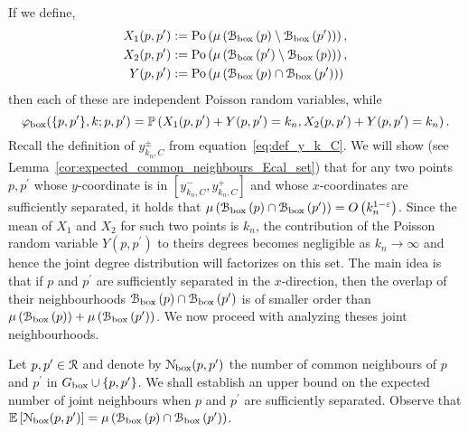 If we define,
\begin{align*}
	X_1(p,p^\prime) &:= {\mathrm{Po}}\left(\mu\left({\mathcal B}_{\text{box}}\left(p\right)\setminus {\mathcal B}_{\text{box}}\left(p^\prime\right)\right)\right),\\
	X_2(p,p^\prime) &:= {\mathrm{Po}}\left(\mu\left({\mathcal B}_{\text{box}}\left(p^\prime\right)\setminus {\mathcal B}_{\text{box}}\left(p\right)\right)\right),\\
	Y(p,p^\prime) &:= {\mathrm{Po}}\left(\mu\left({\mathcal B}_{\text{box}}\left(p\right) \cap {\mathcal B}_{\text{box}}\left(p^\prime\right)\right)\right)
\end{align*}
then each of these are independent Poisson random variables, while
\[
	\varphi_{\mathrm{box}}(\{p,p^\prime\}, k ;p,p^\prime) 
	= \mathbb{P}\left(X_1(p,p^\prime) + Y(p,p^\prime) = k_n, X_2(p,p^\prime) + Y(p,p^\prime) = k_n\right).
\]
Recall the definition of $y_{k_n,C}^\pm$ from equation~\eqref{eq:def_y_k_C}. We will show (see Lemma~\ref{cor:expected_common_neighbours_Ecal_set}) that for any two points $p, p^\prime$ whose $y$-coordinate is in $[y_{k_n, C}^-, y_{k_n,C}^+]$ and whose $x$-coordinates are sufficiently separated, it holds that $\mu\left({\mathcal B}_{\text{box}}\left(p\right) \cap {\mathcal B}_{\text{box}}\left(p^\prime\right)\right) = O\left(k_n^{1-\varepsilon}\right)$. Since the mean of $X_1$ and $X_2$ for such two points is $k_n$, the contribution of the Poisson random variable $Y(p,p^\prime)$ to theirs degrees becomes negligible as $k_n \to \infty$ and hence the joint degree distribution will factorizes on this set. The main idea is that if $p$ and $p^\prime$ are sufficiently separated in the $x$-direction, then the overlap of their neighbourhoods ${\mathcal B}_{\text{box}}\left(p\right) \cap {\mathcal B}_{\text{box}}\left(p^\prime\right)$ is of smaller order than $\mu\left({\mathcal B}_{\text{box}}\left(p\right)\right) + \mu\left({\mathcal B}_{\text{box}}\left(p^\prime\right)\right)$. We now proceed with analyzing theses joint neighbourhoods.

Let $p, p^\prime \in {\mathcal R}$ and denote by ${\mathcal N}_{\text{box}}(p,p^\prime)$ the number of common neighbours of $p$ and $p^\prime$ in $G_{\mathrm{box}} \cup \{p,p^\prime\}$. We shall establish an upper bound on the expected number of joint neighbours when $p$ and $p^\prime$ are sufficiently separated. Observe that $\mathbb{E}\left[{\mathcal N}_{\text{box}}(p,p^\prime)\right] = \mu\left({\mathcal B}_{\text{box}}\left(p\right) \cap {\mathcal B}_{\text{box}}\left(p^\prime\right)\right)$. 


